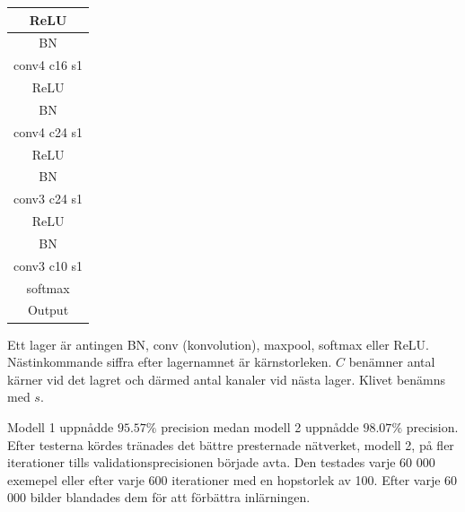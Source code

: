 \documentclass[a4paper,11pt,twoside]{article}
\begin{document}
\begin{center}
\begin{tabular}{ | c |}
            ReLU\\ \hline
            BN\\ \hline
            conv4 c16 s1\\ \hline
            ReLU\\ \hline
            BN\\ \hline
            conv4 c24 s1\\ \hline
            ReLU\\ \hline
            BN\\ \hline
            conv3 c24 s1\\ \hline
            ReLU\\ \hline
            BN\\ \hline
            conv3 c10 s1\\ \hline
            softmax \\ \hline
            Output \\
    \hline
    \end{tabular}
\end{center}

Ett lager är antingen BN, conv (konvolution), maxpool, softmax eller ReLU. Nästinkommande siffra efter lagernamnet är kärnstorleken. $C$ benämner antal kärner vid det lagret och därmed antal kanaler vid nästa lager. Klivet benämns med $s$.

Modell 1 uppnådde $95.57\%$ precision medan modell 2 uppnådde $98.07\%$ precision. Efter testerna kördes tränades det bättre presternade nätverket, modell 2, på fler iterationer tills validationsprecisionen började avta. Den testades varje 60 000 exemepel eller efter varje 600 iterationer med en hopstorlek av 100. Efter varje 60 000 bilder blandades dem för att förbättra inlärningen.
\end{document}
